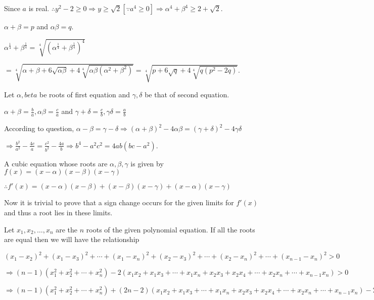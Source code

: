   Since $a$ is real. $\therefore y^2 - 2 \ge 0 \Rightarrow y \ge \sqrt{2} [\because a^4 \ge 0]\Rightarrow
  \alpha^4 + \beta^4 \ge 2 + \sqrt{2}$.
\item $\alpha + \beta = p$ and $\alpha\beta = q$.

  $\alpha^{\frac{1}{4}} + \beta^{\frac{1}{4}} = \sqrt[4]{\left(\alpha^{\frac{1}{4}} +
  \beta^{\frac{1}{4}}\right)^4}$

  $= \sqrt[4]{\alpha + \beta + 6\sqrt{\alpha\beta} + 4\sqrt[4]{\alpha\beta(\alpha^2 + \beta^2)}} =
  \sqrt[4]{p + 6\sqrt{q} + 4\sqrt[4]{q(p^2 - 2q)}}$.
\item Let $\alpha, beta$ be roots of first equation and $\gamma, \delta$ be that of second equation.

  $\alpha + \beta = \frac{b}{a}, \alpha\beta = \frac{c}{a}$ and $\gamma + \delta = \frac{c}{b},
  \gamma\delta = \frac{a}{b}$

  According to question, $\alpha - \beta = \gamma - \delta\Rightarrow (\alpha + \beta)^2 - 4\alpha\beta =
  (\gamma + \delta)^2 - 4\gamma\delta$

  $\Rightarrow \frac{b^2}{a^2} - \frac{4c}{a} = \frac{c^2}{b^2} - \frac{4a}{b}\Rightarrow b^4 - a^2c^2 =
  4ab(bc - a^2)$.
\item A cubic equation whose roots are $\alpha, \beta, \gamma$ is given by $f(x) = (x - \alpha)(x -
  \beta)(x - \gamma)$

  $\therefore f'(x) = (x - \alpha)(x - \beta) + (x - \beta)(x - \gamma) + (x - \alpha)(x - \gamma)$

  Now it is trivial to prove that a sign change occurs for the given limits for $f'(x)$ and thus a root lies
  in these limits.
\item Let $x_1, x_2, \ldots, x_n$ are the $n$ roots of the given polynomial equation. If all the roots are
  equal then we will have the relationship

  $(x_1 - x_2)^2 + (x_1 - x_3)^2 + \cdots + (x_1 - x_n)^2 + (x_2 - x_3)^2 + \cdots + (x_2 - x_n)^2 + \cdots
  + (x_{n - 1} - x_n)^2 > 0$

  $\Rightarrow (n - 1)(x_1^2 + x_2^2 + \cdots + x_n^2) - 2(x_1x_2 + x_1x_3 + \cdots + x_1x_n + x_2x_3 +
  x_2x_4 + \cdots + x_2x_n + \cdots + x_{n - 1}x_n) > 0$

  $\Rightarrow (n - 1)(x_1^2 + x_2^2 + \cdots + x_n^2) + (2n - 2)(x_1x_2 + x_1x_3 + \cdots + x_1x_n + x_2x_3 +
  x_2x_4 + \cdots + x_2x_n + \cdots + x_{n - 1}x_n) - 2n(x_1x_2 + x_1x_3 + \cdots + x_1x_n + x_2x_3 +
  x_2x_4 + \cdots + x_2x_n + \cdots + x_{n - 1}x_n) > 0$

